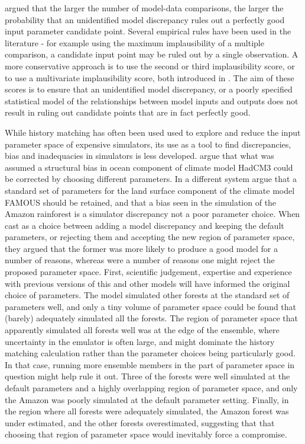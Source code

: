 \documentclass[gmd, manuscript]{copernicus}
\begin{document}
 \cite{mcneall2016impact} argued that the larger the number of model-data comparisons, the larger the probability that an unidentified model discrepancy rules out a perfectly good input parameter candidate point. Several empirical rules have been used in the literature - for example using the maximum implausibility of a multiple comparison, a candidate input point may be ruled out by a single observation. A more conservative approach is to use the second or third implausibility score, or to use a multivariate implausibility score, both introduced in \cite{vernon2010galaxy}. The aim of these scores is to ensure that an unidentified model discrepancy, or a poorly specified statistical model of the relationships between model inputs and outputs does not result in ruling out candidate points that are in fact perfectly good.   

While history matching has often been used used to explore and reduce the input parameter space of expensive simulators, its use as a tool to find discrepancies, bias and inadequacies in simulators is less developed. \cite{williamson2015identifying} argue that what was assumed a structural bias in ocean component of climate model HadCM3 could be corrected by choosing different parameters. In a different system \cite{mcneall2016impact} argue that a standard set of parameters for the land surface component of the climate model FAMOUS should be retained, and that a bias seen in the simulation of the Amazon rainforest is a simulator discrepancy not a poor parameter choice. When cast as a choice between adding a model discrepancy and keeping the default parameters, or rejecting them and accepting the new region of parameter space, they argued that the former was more likely to produce a good model for a number of reasons, whereas were a number of reasons one might reject the proposed parameter space. First, scientific judgement, expertise and experience with previous versions of this and other models will have informed the original choice of parameters. The model simulated other forests at the standard set of parameters well, and only a tiny volume of parameter space could be found that (barely) adequately simulated all the forests.  The region of parameter space that apparently simulated all forests well was at the edge of the ensemble, where uncertainty in the emulator is often large, and might dominate the history matching calculation rather than the parameter choices being particularly good. In that case, running more ensemble members in the part of parameter space in question might help rule it out. Three of the forests were well simulated at the default parameters and a highly overlapping region of parameter space, and only the Amazon was poorly simulated at the default parameter setting. Finally, in the region where all forests were adequately simulated, the Amazon forest was under estimated, and the other forests overestimated, suggesting that that choosing that region of parameter space would inevitably force a compromise. 
\end{document}
